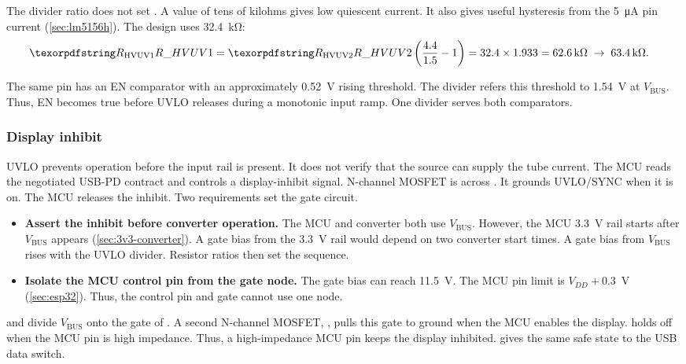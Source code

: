 The divider ratio does not set . A value of tens of kilohms gives
low quiescent current. It also gives useful hysteresis from the
\SI{5}{\micro\ampere} pin current (\cref{sec:lm5156h}). The design uses
\SI{32.4}{\kilo\ohm}:
\begin{align*}
  \des{R}{HVUV1} &= \des{R}{HVUV2}\left(\frac{4.4}{1.5} - 1\right)
  = 32.4 \times 1.933 = \SI{62.6}{\kilo\ohm}
  \;\rightarrow\; \SI{63.4}{\kilo\ohm}.
\end{align*}



The same pin has an EN comparator with an approximately
\SI{0.52}{\volt} rising threshold. The divider refers this threshold to
\SI{1.54}{\volt} at $V_{\mathrm{BUS}}$. Thus, EN becomes true before UVLO
releases during a monotonic input ramp. One divider serves both comparators.

\subsubsection{Display inhibit}\label{sec:hv-inhibit}

UVLO prevents operation before the input rail is present. It does not verify
that the source can supply the tube current. The MCU reads the negotiated
USB-PD contract and controls a display-inhibit signal. N-channel MOSFET
 is across . It grounds UVLO/SYNC when it is on. The
MCU releases the inhibit. Two requirements set the gate circuit.

\begin{itemize}[nosep]
  \item \textbf{Assert the inhibit before converter operation.} The MCU and
    converter both use $V_{\mathrm{BUS}}$. However, the MCU 3.3~V rail starts
    after $V_{\mathrm{BUS}}$ appears (\cref{sec:3v3-converter}). A gate bias
    from the 3.3~V rail would depend on two converter start times. A gate bias
    from $V_{\mathrm{BUS}}$ rises with the UVLO divider. Resistor ratios then set
    the sequence.
  \item \textbf{Isolate the MCU control pin from the gate node.} The gate bias
    can reach \SI{11.5}{\volt}. The MCU pin limit is \(V_{DD}+0.3\)~V
    (\cref{sec:esp32}). Thus, the control pin and gate cannot use one node.
\end{itemize}

 and  divide $V_{\mathrm{BUS}}$ onto the gate of
. A second N-channel MOSFET, , pulls this gate to
ground when the MCU enables the display.  holds
 off when the MCU pin is high impedance. Thus, a high-impedance
MCU pin keeps the display inhibited.  gives the same safe
state to the USB data switch.

